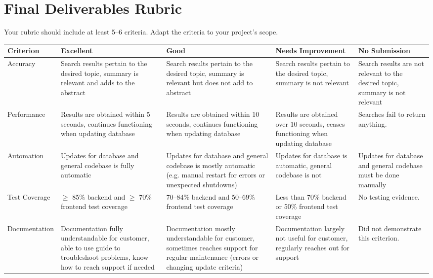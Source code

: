 \documentclass{article}
\begin{document}
\section*{Final Deliverables Rubric}
Your rubric should include at least 5--6 criteria. Adapt the criteria to your project’s scope.  

\begin{tabularx}{\textwidth}{|X|X|X|X|X|}
    \hline
    \textbf{Criterion} & \textbf{Excellent} & \textbf{Good} & \textbf{Needs Improvement} & \textbf{No Submission}\\
    \hline
    Accuracy & Search results pertain to the desired topic, summary is relevant and adds to the abstract & Search results pertain to the desired topic, summary is relevant but does not add to abstract & Search results pertain to the desired topic, summary is not relevant & Search results are not relevant to the desired topic, summary is not relevant\\
    \hline     
    Performance & Results are obtained within 5 seconds, continues functioning when updating database & Results are obtained within 10 seconds, continues functioning when updating database & Results are obtained over 10 seconds, ceases functioning when updating database & Searches fail to return anything. \\
    \hline
    Automation & Updates for database and general codebase is fully automatic & Updates for database and general codebase is mostly automatic (e.g. manual restart for errors or unexpected shutdowns) & Updates for database is automatic, general codebase is not & Updates for database and general codebase must be done manually \\
    \hline     
     Test Coverage & $\geq$ 85\% backend and $\geq$ 70\% frontend test coverage & 70--84\% backend and 50--69\% frontend test coverage & Less than 70\% backend or 50\% frontend test coverage & No testing evidence. \\
    \hline
    Documentation & Documentation fully understandable for customer, able to use guide to troubleshoot problems, know how to reach support if needed &  Documentation mostly understandable for customer, sometimes reaches support for regular maintenance (errors or changing update criteria) &  Documentation largely not useful for customer, regularly reaches out for support & Did not demonstrate this criterion. \\
    \hline
    
\end{tabularx}
\end{document}
